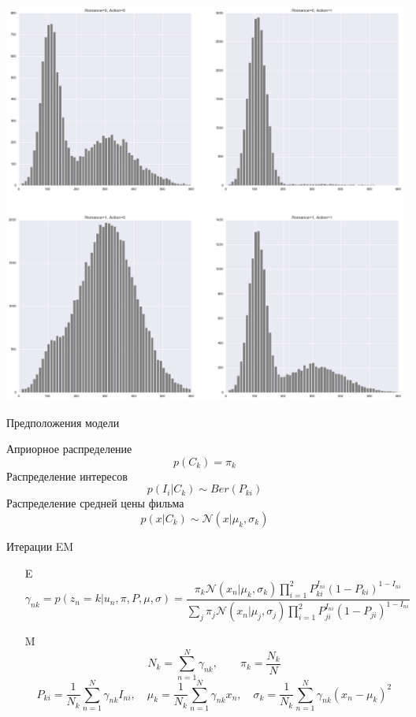 \documentclass[aspectratio=169]{beamer}
\begin{document}
\begin{frame}{}

\begin{center}
\includegraphics[height=0.8\textheight]{images/movies.png}
\end{center}

\end{frame}

\begin{frame}{Предположения модели}

Априорное распределение
\[
p(C_k) = \pi_k
\]
Распределение интересов
\[
p(I_i | C_k) \sim Ber(P_{ki})
\]
Распределение средней цены фильма
\[
p(x | C_k) \sim \mathcal{N}(x | \mu_k, \sigma_k)
\]

\end{frame}

\begin{frame}{Итерации EM}

\begin{itemize}
\item[E]
\[
\gamma_{nk} = p(z_n = k | u_n, \pi, P, \mu, \sigma) = \frac{\pi_k \mathcal{N}(x_n | \mu_k, \sigma_k) \prod_{i=1}^2 P_{ki}^{I_{ni}}(1 - P_{ki})^{1 - I_{ni}}}{\sum_j \pi_j \mathcal{N}(x_n | \mu_j, \sigma_j) \prod_{i=1}^2 P_{ji}^{I_{ni}}(1 - P_{ji})^{1 - I_{ni}}}
\]
\item[M]
\[
N_k = \sum_{n=1}^N \gamma_{nk}, \qquad \pi_k = \frac{N_k}{N} 
\]
\[
P_{ki} = \frac{1}{N_k} \sum_{n=1}^N \gamma_{nk} I_{ni}, \quad \mu_{k} = \frac{1}{N_k} \sum_{n=1}^N \gamma_{nk} x_n, \quad \sigma_k = \frac 1 {N_k} \sum_{n=1}^N \gamma_{nk} ({x}_n - \mu_k)^2
\]
\end{itemize}

\end{frame}
\end{document}
